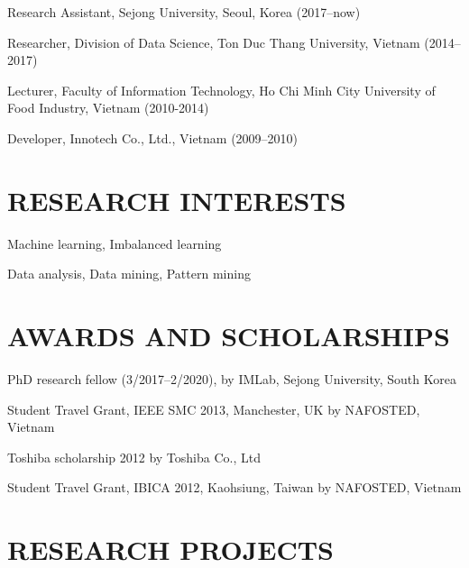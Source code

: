 \documentclass[letterpaper]{article}
\renewenvironment{itemize}{
  \begin{list}{}{
    \setlength{\leftmargin}{1.5em}
  }
}{
  \end{list}
}
\begin{document}
\begin{itemize}

\item Research Assistant, Sejong University, Seoul, Korea (2017--now)
\item Researcher, Division of Data Science, Ton Duc Thang University, Vietnam (2014--2017)
\item Lecturer, Faculty of Information Technology, Ho Chi Minh City University of Food Industry, Vietnam (2010-2014)
\item Developer, Innotech Co., Ltd., Vietnam (2009--2010)
\end{itemize}

\section*{RESEARCH INTERESTS}

\begin{itemize}

\item Machine learning, Imbalanced learning
\item Data analysis, Data mining, Pattern mining 

\end{itemize}


\section*{AWARDS AND SCHOLARSHIPS}

\begin{itemize}

\item PhD research fellow (3/2017--2/2020), by IMLab, Sejong University, South Korea 
\item Student Travel Grant, IEEE SMC 2013, Manchester, UK  by NAFOSTED, Vietnam
\item Toshiba scholarship 2012 by Toshiba Co., Ltd
\item Student Travel Grant, IBICA 2012, Kaohsiung, Taiwan by NAFOSTED, Vietnam

\end{itemize}

\section*{RESEARCH PROJECTS}
\end{document}
